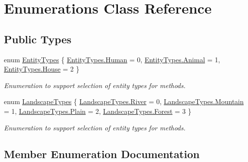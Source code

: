\hypertarget{class_enumerations}{}\section{Enumerations Class Reference}
\label{class_enumerations}
\subsection*{Public Types}
\begin{DoxyCompactItemize}
\item 
enum \hyperlink{class_enumerations_a3822629637240e477854c9552d693417}{Entity\+Types} \{ \hyperlink{class_enumerations_a3822629637240e477854c9552d693417ac1bb19b27818343c1926119b958741b5}{Entity\+Types.\+Human} = 0, 
\hyperlink{class_enumerations_a3822629637240e477854c9552d693417a161e7ce7bfdc89ab4b9f52c1d4c94212}{Entity\+Types.\+Animal} = 1, 
\hyperlink{class_enumerations_a3822629637240e477854c9552d693417aaebfe46795575772b7cf413e25caeab9}{Entity\+Types.\+House} = 2
 \}\begin{DoxyCompactList}\small\item\em Enumeration to support selection of entity types for methods. \end{DoxyCompactList}
\item 
enum \hyperlink{class_enumerations_ae4fb3bfedbf076bc31c8939baac88745}{Landscape\+Types} \{ \hyperlink{class_enumerations_ae4fb3bfedbf076bc31c8939baac88745a149529f6dcbcc198787e69a11235422e}{Landscape\+Types.\+River} = 0, 
\hyperlink{class_enumerations_ae4fb3bfedbf076bc31c8939baac88745aec9903c79dd510ffa43f69ee867a9002}{Landscape\+Types.\+Mountain} = 1, 
\hyperlink{class_enumerations_ae4fb3bfedbf076bc31c8939baac88745a4cd8413207629a963225f4314b53adcd}{Landscape\+Types.\+Plain} = 2, 
\hyperlink{class_enumerations_ae4fb3bfedbf076bc31c8939baac88745aac12ee4aedb176eb73ce3f6c0d1e9036}{Landscape\+Types.\+Forest} = 3
 \}\begin{DoxyCompactList}\small\item\em Enumeration to support selection of entity types for methods. \end{DoxyCompactList}
\end{DoxyCompactItemize}


\subsection{Member Enumeration Documentation}
\mbox{\label{class_enumerations_a3822629637240e477854c9552d693417}} 
